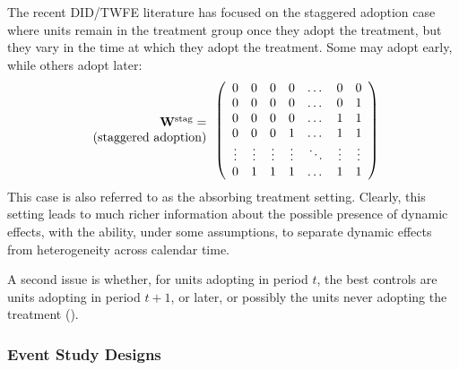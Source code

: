 \documentclass[letterpaper,12pt,leqno]{article}
\newcommand{\stag}{{\rm stag}}
\newcommand{\ttock}{1}
\newcommand{\ttick}{0}
\newcommand{\bw}{{\bf W}}
\begin{document}
The recent DID/TWFE literature has focused on the staggered adoption case where units remain in the treatment group once they adopt the treatment, but they vary in the time at which they adopt the treatment. Some may adopt early, while others adopt  later:
\[
\begin{array}{r}{\bw^\stag=} \\
{(\text{staggered  adoption})}
\end{array}\left(
\begin{array}{ccccccccc}
	\ttick &  \ttick & \ttick  & \ttick & \dots & \ttick & \ttick \\
	\ttick  & \ttick &  \ttick & \ttick   & \dots  & \ttick& {\ttock}  \\
	\ttick  & \ttick &  \ttick  & \ttick  & \dots  & \ttock& {\ttock}  \\
	\ttick  & \ttick & \ttick &  {\ttock}   & \dots & \ttock & {\ttock}  \\
	\vdots   &  \vdots  &  \vdots& \vdots &\ddots &\vdots &\vdots \\
	\ttick  & {\ttock} &  {\ttock}   & {\ttock} & \dots  & \ttock& {\ttock}  \\
\end{array}
\right)
\]
This case is also referred to as the {absorbing treatment} setting. Clearly, this setting leads to much richer information about the possible presence of dynamic effects, with the ability, under some assumptions, to separate dynamic effects from heterogeneity across calendar time.

A second issue is whether, for units adopting in period $t$, the best controls are units adopting in period $t+1$, or later, or possibly the units never adopting the treatment (\citealp{callaway2020difference}).

\subsubsection{Event Study Designs}\label{event_study}
\end{document}
